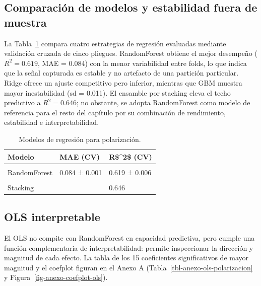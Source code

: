 \documentclass[
  letterpaper,
  numbers=noendperiod,
  fontsize=11pt,
  DIV=12,
  titlepage=false]{scrreprt}
\begin{document}
\subsection{Comparación de modelos y estabilidad fuera de
muestra}\label{comparaciuxf3n-de-modelos-y-estabilidad-fuera-de-muestra}

La Tabla~\ref{tbl-cv-regresion} compara cuatro estrategias de regresión
evaluadas mediante validación cruzada de cinco pliegues. RandomForest
obtiene el mejor desempeño (\(R^2 = 0.619\), MAE = 0.084) con la menor
variabilidad entre folds, lo que indica que la señal capturada es
estable y no artefacto de una partición particular. Ridge ofrece un
ajuste competitivo pero inferior, mientras que GBM muestra mayor
inestabilidad (sd = 0.011). El ensamble por stacking eleva el techo
predictivo a \(R^2 =
0.646\); no obstante, se adopta RandomForest como modelo de referencia
para el resto del capítulo por su combinación de rendimiento,
estabilidad e interpretabilidad.

\begin{longtable}[t]{lll}

\caption{\label{tbl-cv-regresion}Modelos de regresión para
polarización.}

\tabularnewline

\toprule
Modelo & MAE (CV) & R\$\textasciicircum{}2\$ (CV)\\
\midrule
\cellcolor{gray!10}{Ridge} & \cellcolor{gray!10}{0.098 ± 0.001} & \cellcolor{gray!10}{0.553 ± 0.006}\\
RandomForest & 0.084 ± 0.001 & 0.619 ± 0.006\\
\cellcolor{gray!10}{GBM} & \cellcolor{gray!10}{0.108 ± 0.002} & \cellcolor{gray!10}{0.474 ± 0.011}\\
Stacking &  & 0.646\\
\bottomrule

\end{longtable}

\subsection{OLS interpretable}\label{ols-interpretable}

El OLS no compite con RandomForest en capacidad predictiva, pero cumple
una función complementaria de interpretabilidad: permite inspeccionar la
dirección y magnitud de cada efecto. La tabla de los 15 coeficientes
significativos de mayor magnitud y el coefplot figuran en el Anexo A
(Tabla~\ref{tbl-anexo-ols-polarizacion} y
Figura~\ref{fig-anexo-coefplot-ols}).
\end{document}
